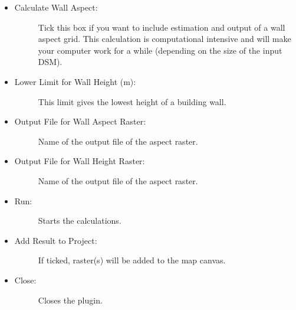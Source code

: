 \documentclass[letterpaper,10pt,english]{sphinxmanual}
\begin{document}
\begin{itemize}
\item {} \begin{description}
\item[{Calculate Wall Aspect:}] \leavevmode
Tick this box if you want to include estimation and output of a wall aspect grid. This calculation is computational intensive and will make your computer work for a while (depending on the size of the input DSM).

\end{description}

\item {} \begin{description}
\item[{Lower Limit for Wall Height (m):}] \leavevmode
This limit gives the lowest height of a building wall.

\end{description}

\item {} \begin{description}
\item[{Output File for Wall Aspect Raster:}] \leavevmode
Name of the output file of the aspect raster.

\end{description}

\item {} \begin{description}
\item[{Output File for Wall Height Raster:}] \leavevmode
Name of the output file of the aspect raster.

\end{description}

\item {} \begin{description}
\item[{Run:}] \leavevmode
Starts the calculations.

\end{description}

\item {} \begin{description}
\item[{Add Result to Project:}] \leavevmode
If ticked, raster(s) will be added to the map canvas.

\end{description}

\item {} \begin{description}
\item[{Close:}] \leavevmode
Closes the plugin.


\end{description}
\end{itemize}
\end{document}
